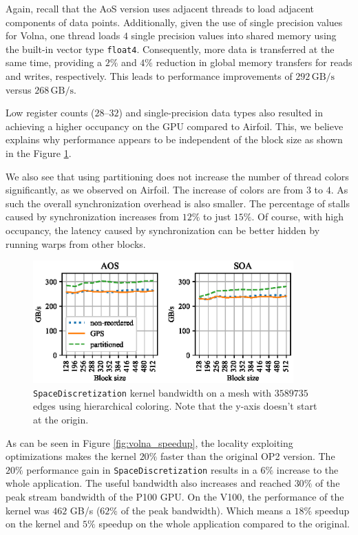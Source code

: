 Again, recall that the AoS version uses adjacent threads to load adjacent 
components of data points. Additionally, given the use of single precision 
values for Volna, one thread loads $4$ single precision values into shared 
memory using the built-in vector type \lstinline!float4!. Consequently, more 
data is transferred at the same time, providing a $2\%$ and $4\%$ reduction
in global memory transfers for reads and writes, respectively. This leads 
to performance improvements of $292\,\text{GB/s}$ versus $268\,\text{GB/s}$.

Low register counts ($28$--$32$) and single-precision data types also 
resulted in achieving a higher occupancy on the GPU compared to Airfoil. This, 
we believe explains why performance appears to be independent of the block size 
as shown in the Figure \ref{fig:volna_bw-vs-bs_hier}. 

We also see that using partitioning does not increase the number of thread 
colors significantly, as we observed on Airfoil. The increase of colors are 
from $3$ to $4$. As such the overall synchronization overhead is also smaller. 
The percentage of stalls caused by synchronization increases from $12\%$ to just 
$15\%$. Of course, with high occupancy, the latency caused by synchronization 
can be better hidden by running warps from other blocks. 


\begin{figure}[Htbp]
  \centering
  \includegraphics[width=10cm]{fig/volna_bw-vs-bs_hier.eps}
  \caption{\texttt{SpaceDiscretization} kernel bandwidth on a mesh with
  $3589735$ edges using hierarchical coloring. Note that the y-axis doesn't
  start at the origin.}
  \label{fig:volna_bw-vs-bs_hier}
\end{figure}

As can be seen in Figure \ref{fig:volna_speedup}, the locality exploiting 
optimizations makes the kernel $20\%$ faster than the original OP2 version. The 
$20\%$ performance gain in \texttt{SpaceDiscretization} results in a $6\%$ 
increase to the whole application. The useful bandwidth also increases and 
reached $30\%$ of the peak stream bandwidth of the P100 GPU. On the V100, the 
performance of the kernel was $462$ GB/s ($62\%$ of the peak bandwidth). Which 
means a $18\%$ speedup on the kernel and $5\%$ speedup on the whole
application compared to the original.

